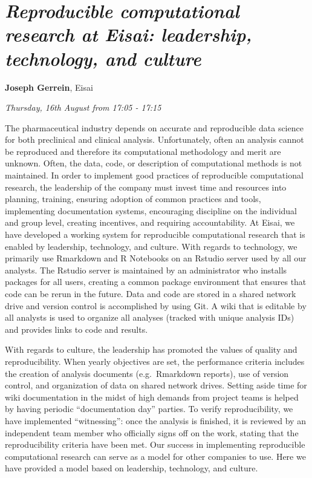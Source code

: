 \documentclass[]{book}
\theoremstyle{definition}
\theoremstyle{definition}
\theoremstyle{definition}
\theoremstyle{remark}
\begin{document}
\hypertarget{reproducible-computational-research-at-eisai-leadership-technology-and-culture}{%
\section{\texorpdfstring{\emph{Reproducible computational research at
Eisai: leadership, technology, and
culture}}{Reproducible computational research at Eisai: leadership, technology, and culture}}\label{reproducible-computational-research-at-eisai-leadership-technology-and-culture}}

\textbf{Joseph Gerrein}, Eisai

\emph{Thursday, 16th August from 17:05 - 17:15}

The pharmaceutical industry depends on accurate and reproducible data
science for both preclinical and clinical analysis. Unfortunately, often
an analysis cannot be reproduced and therefore its computational
methodology and merit are unknown. Often, the data, code, or description
of computational methods is not maintained. In order to implement good
practices of reproducible computational research, the leadership of the
company must invest time and resources into planning, training, ensuring
adoption of common practices and tools, implementing documentation
systems, encouraging discipline on the individual and group level,
creating incentives, and requiring accountability. At Eisai, we have
developed a working system for reproducible computational research that
is enabled by leadership, technology, and culture. With regards to
technology, we primarily use Rmarkdown and R Notebooks on an Rstudio
server used by all our analysts. The Rstudio server is maintained by an
administrator who installs packages for all users, creating a common
package environment that ensures that code can be rerun in the future.
Data and code are stored in a shared network drive and version control
is accomplished by using Git. A wiki that is editable by all analysts is
used to organize all analyses (tracked with unique analysis IDs) and
provides links to code and results.

With regards to culture, the leadership has promoted the values of
quality and reproducibility. When yearly objectives are set, the
performance criteria includes the creation of analysis documents
(e.g.~Rmarkdown reports), use of version control, and organization of
data on shared network drives. Setting aside time for wiki documentation
in the midst of high demands from project teams is helped by having
periodic ``documentation day'' parties. To verify reproducibility, we
have implemented ``witnessing'': once the analysis is finished, it is
reviewed by an independent team member who officially signs off on the
work, stating that the reproducibility criteria have been met. Our
success in implementing reproducible computational research can serve as
a model for other companies to use. Here we have provided a model based
on leadership, technology, and culture.
\end{document}
